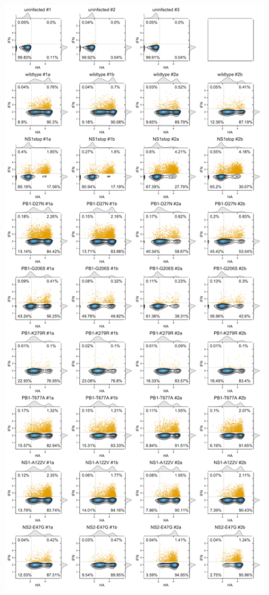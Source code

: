 \documentclass[9pt,lineno]{elife}
\begin{document}
\begin{figure}
{\includegraphics[height=0.75\textheight]{figures/Validation_Figure/SNP_flow_plot.pdf}}
\label{figsupp:SNPflow}


\end{figure}
\end{document}
